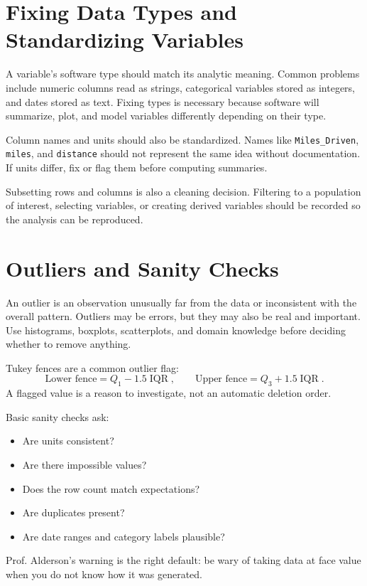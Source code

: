 {\section{Fixing Data Types and Standardizing Variables}

A variable's software type should match its analytic meaning.  Common problems include numeric columns read as strings, categorical variables stored as integers, and dates stored as text.  Fixing types is necessary because software will summarize, plot, and model variables differently depending on their type.

Column names and units should also be standardized.  Names like \texttt{Miles\_Driven}, \texttt{miles}, and \texttt{distance} should not represent the same idea without documentation.  If units differ, fix or flag them before computing summaries.

Subsetting rows and columns is also a cleaning decision.  Filtering to a population of interest, selecting variables, or creating derived variables should be recorded so the analysis can be reproduced.

\section{Outliers and Sanity Checks}

An outlier is an observation unusually far from the data or inconsistent with the overall pattern.  Outliers may be errors, but they may also be real and important.  Use histograms, boxplots, scatterplots, and domain knowledge before deciding whether to remove anything.

Tukey fences are a common outlier flag:
\begin{equation}
  \text{Lower fence}=Q_1-1.5\operatorname{IQR},
  \qquad
  \text{Upper fence}=Q_3+1.5\operatorname{IQR}.
  \label{eq:ch3-tukey-fences}
\end{equation}
A flagged value is a reason to investigate, not an automatic deletion order.

Basic sanity checks ask:
\begin{itemize}
  \item Are units consistent?
  \item Are there impossible values?
  \item Does the row count match expectations?
  \item Are duplicates present?
  \item Are date ranges and category labels plausible?
\end{itemize}
Prof. Alderson's warning is the right default: be wary of taking data at face value when you do not know how it was generated.

}

